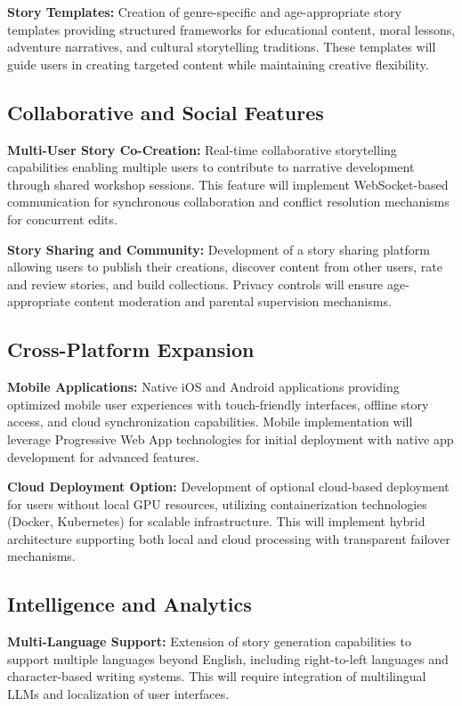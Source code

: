 \textbf{Story Templates:} Creation of genre-specific and age-appropriate story templates providing structured frameworks for educational content, moral lessons, adventure narratives, and cultural storytelling traditions. These templates will guide users in creating targeted content while maintaining creative flexibility.

\subsection{Collaborative and Social Features}

\textbf{Multi-User Story Co-Creation:} Real-time collaborative storytelling capabilities enabling multiple users to contribute to narrative development through shared workshop sessions. This feature will implement WebSocket-based communication for synchronous collaboration and conflict resolution mechanisms for concurrent edits.

\textbf{Story Sharing and Community:} Development of a story sharing platform allowing users to publish their creations, discover content from other users, rate and review stories, and build collections. Privacy controls will ensure age-appropriate content moderation and parental supervision mechanisms.

\subsection{Cross-Platform Expansion}

\textbf{Mobile Applications:} Native iOS and Android applications providing optimized mobile user experiences with touch-friendly interfaces, offline story access, and cloud synchronization capabilities. Mobile implementation will leverage Progressive Web App technologies for initial deployment with native app development for advanced features.

\textbf{Cloud Deployment Option:} Development of optional cloud-based deployment for users without local GPU resources, utilizing containerization technologies (Docker, Kubernetes) for scalable infrastructure. This will implement hybrid architecture supporting both local and cloud processing with transparent failover mechanisms.

\subsection{Intelligence and Analytics}

\textbf{Multi-Language Support:} Extension of story generation capabilities to support multiple languages beyond English, including right-to-left languages and character-based writing systems. This will require integration of multilingual LLMs and localization of user interfaces.

